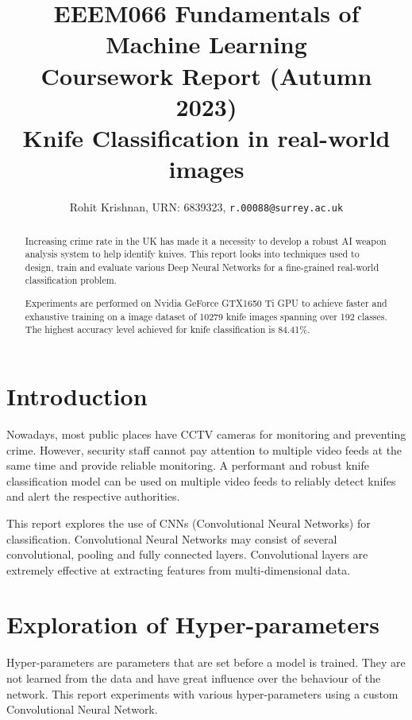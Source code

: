 \documentclass[10pt,twocolumn,letterpaper]{article}
\begin{document}
\title{EEEM066 Fundamentals of Machine Learning \\ Coursework Report (Autumn 2023) \\ Knife Classification in real-world images}

\author{Rohit Krishnan, {URN: 6839323},
  {\tt r.00088@surrey.ac.uk}
}
\maketitle

\begin{abstract}
  Increasing crime rate in the UK has made it a necessity to develop a robust AI weapon analysis system to help
  identify knives. This report looks into techniques used to design, train and evaluate various Deep Neural Networks
  for a fine-grained real-world classification problem.

  Experiments are performed on Nvidia GeForce GTX1650 Ti GPU to achieve faster and exhaustive training on a image
  dataset of 10279 knife images spanning over 192 classes. The highest accuracy level achieved for knife classification
  is 84.41\%.
\end{abstract}

\section{Introduction}
\label{sec:intro}

Nowadays, most public places have CCTV cameras for monitoring and preventing crime. However, security staff
cannot pay attention to multiple video feeds at the same time and provide reliable monitoring. A performant and
robust knife classification model can be used on multiple video feeds to reliably detect knifes and alert the
respective authorities.

This report explores the use of CNNs (Convolutional Neural Networks) for classification. Convolutional Neural Networks
may consist of several convolutional, pooling and fully connected layers. Convolutional layers are extremely effective
at extracting features from multi-dimensional data.


\section{Exploration of Hyper-parameters}
\label{sec:exp_hyper_params}

Hyper-parameters are parameters that are set before a model is trained. They are not learned from the data and have
great influence over the behaviour of the network. This report experiments with various hyper-parameters using a
custom Convolutional Neural Network.
\end{document}
